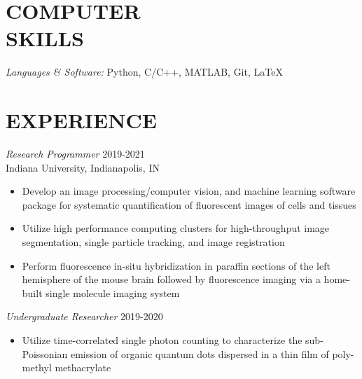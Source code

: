 \documentclass[margin, 10pt]{res} %
\begin{document}
\begin{resume}

\section{COMPUTER \\ SKILLS} 

{\sl Languages \& Software:} 
Python, C/C++, MATLAB, Git, LaTeX\\
 
 
\section{EXPERIENCE}

{\sl Research Programmer} \hfill 2019-2021 \\
Indiana University, Indianapolis, IN

\begin{itemize} \itemsep -2pt %

\item Develop an image processing/computer vision, and machine learning software package for systematic quantification of fluorescent images of cells and tissues

\item Utilize high performance computing clusters for high-throughput image segmentation, single particle tracking, and image registration

\item Perform fluorescence in-situ hybridization in paraffin sections of the left hemisphere of the mouse brain followed by fluorescence imaging via a home-built single molecule imaging system
 
\end{itemize}
 
{\sl Undergraduate Researcher} \hfill 2019-2020
\begin{itemize} \itemsep -2pt %

\item Utilize time-correlated single photon counting to characterize the sub-Poissonian emission of organic quantum dots dispersed in a thin film of poly-methyl methacrylate


\end{itemize}
\end{resume}
\end{document}
